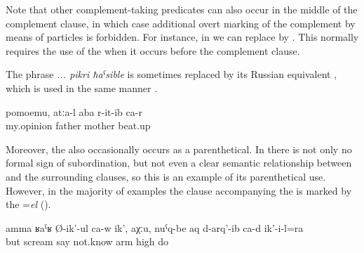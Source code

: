 Note that other complement-taking predicates can also occur in the middle of the complement clause, in which case additional overt marking of the complement by means of particles is forbidden. For instance, in  we can replace  by  . This  normally requires the use of the   when it occurs before the complement clause.

The phrase \textit{... pikri ħaˁsible} is sometimes replaced by its Russian equivalent , which is used in the same manner . 
%
\begin{exe}
	\ex	\label{ex:In my mind, the father beat up the mother@23}
	\gll	pomoemu,	atːa-l	aba	r-it-ib	ca-r\\
		my.opinion	father	mother	beat.up	\\
	\glt	{}
\end{exe}

Moreover, the    also occasionally occurs as a parenthetical. In  there is not only no formal sign of subordination, but not even a clear semantic relationship between  and the surrounding clauses, so this is an example of its parenthetical use. However, in the majority of examples the clause accompanying the  is marked by the  =\textit{el} ().
%
\begin{exe}
	\ex	\label{ex:But he is screaming, I don't know, he also rose up his arms@21}
	\gll	amma	ʁaˁʁ Ø-ik'-ul ca-w	ik',	aχːu,	nuˁq-be	aq d-arq'-ib	ca-d	ik'-i-l=ra\\
		but	scream say 		not.know	arm		high do		\\
	\glt	{}
\end{exe}




